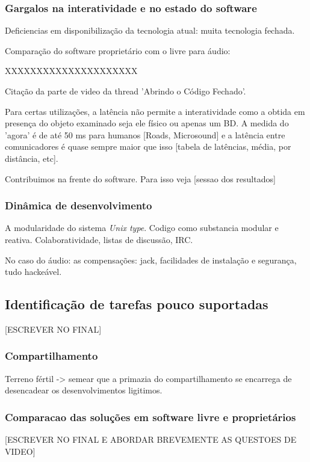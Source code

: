 	  \subsubsection{Gargalos na interatividade e no estado do software}
	  \label{sec:gargalos}
	  Deficiencias em disponibilização da tecnologia atual: muita
	  tecnologia fechada.

	  Comparação do software proprietário com o livre para áudio:

	  XXXXXXXXXXXXXXXXXXXXX

	  Citação da parte de video da thread 'Abrindo o Código Fechado'.

	  Para certas utilizações, a latência não permite a interatividade como 
	  a obtida em presença do objeto examinado seja ele físico ou apenas um BD.
	  A medida do 'agora' é de até 50 ms para humanos [Roads, Microsound] e a latência entre comunicadores é
	  quase sempre maior que isso [tabela de latências, média, por distância, etc].

	  Contribuimos na frente do software. Para isso veja [sessao dos resultados]


	  \subsubsection{Dinâmica de desenvolvimento}
	  \label{sec:din_dev}
	  A modularidade do sistema \emph{Unix type}. Codigo como substancia modular
	  e reativa. Colaboratividade, listas de discussão, IRC.

	  No caso do áudio: as compensações: jack,
	  facilidades de instalação e segurança, tudo hackeável.


      \subsection{Identificação de tarefas pouco suportadas}
      \label{sec:tarefas_n_sup}
  [ESCREVER NO FINAL]

	  \subsubsection{Compartilhamento}
	  \label{sec:comp_tec}
	  Terreno fértil -> semear que a primazia do compartilhamento se encarrega de
	  desencadear os desenvolvimentos ligitimos.

	  \subsubsection{Comparacao das soluções em software livre e proprietários}
	  \label{sec:sl_prop}
      [ESCREVER NO FINAL E ABORDAR BREVEMENTE AS QUESTOES DE VIDEO]




